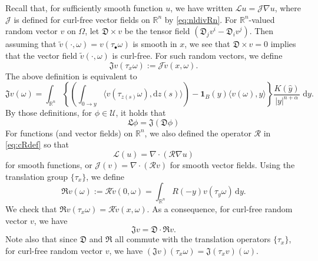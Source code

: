 \documentclass[11pt,reqno]{amsart}
\theoremstyle{definition}
\theoremstyle{remark}
\numberwithin{equation}{section}
\newcommand{\R}{{\mathbb{R}}}
\newcommand{\dd}{\mathrm{d}}
\begin{document}
Recall that, for sufficiently smooth function $u$, we have written $\mathscr{L}u = \mathscr{J}\nabla u$, where $\mathscr{J}$ is defined for curl-free vector fields on $\R^n$ by \eqref{eq:nldivRn}. For $\R^n$-valued random vector $v$ on $\Omega$, let $\mathfrak{D}\times v$ be the tensor field $(\mathfrak{D}_j v^i - \mathfrak{D}_i v^j)$. Then assuming that $\widetilde v(\cdot,\omega) = v(\tau_{\bullet}\omega)$ is smooth in $x$, we see that $\mathfrak{D}\times v = 0$ implies that the vector field $\widetilde v(\cdot,\omega)$ is curl-free. For such random vectors, we define
\begin{equation}
\label{eq:JJ}
\mathfrak{J}v(\tau_x \omega) := \mathscr{J}\widetilde v(x,\omega).
\end{equation}
The above definition is equivalent to
\begin{equation*}
\mathfrak{J}v(\omega) = \int_{\R^n} \left\{\left(\int_{0\to y} \langle v(\tau_{z(s)}\omega), \mathrm{d}z(s)\rangle\right) -\mathbf{1}_B (y)\langle v(\omega),y \rangle\right\}\frac{K(\hat{y})}{|y|^{n+\alpha}}\,\,\mathrm{d}y.
\end{equation*}
By those definitions, for $\phi \in \mathscr{U}$, it holds that
\begin{equation}
\label{eq:LJprob}
    \mathfrak{L} \phi = \mathfrak{J}(\mathfrak{D}\phi)
\end{equation}
For functions (and vector fields) on $\R^n$, we also defined the operator $\mathcal{R}$ in \eqref{eq:cRdef} so that 
\begin{equation*}
\mathscr{L}(u) = \nabla \cdot (\mathcal{R}\nabla u)
\end{equation*}
for smooth functions, or $\mathscr{J}(v) = \nabla \cdot (\mathcal{R}v)$ for smooth vector fields. Using the translation group $\{\tau_x\}$, we define
\begin{equation}
    \label{eq:fRdef}
\mathfrak{R} v(\omega) := \mathcal{R}\widetilde{v}(0,\omega) = \int_{\R^n} R(-y)v(\tau_y\omega)\,\dd y.
\end{equation}
We check that $\mathfrak{R}v(\tau_x \omega) = \mathcal{R}\widetilde{v}(x,\omega)$. As a consequence, for curl-free random vector $v$, we have
\begin{equation*}
    \mathfrak{J}v = \mathfrak{D}\cdot \mathfrak{R}v.
\end{equation*}
Note also that since $\mathfrak{D}$ and $\mathfrak{R}$ all commute with the translation operators $\{\tau_x\}$, for curl-free random vector $v$, we have $(\mathfrak{J}v)(\tau_x\omega) = \mathfrak{J}(\tau_x v)(\omega)$.
\end{document}
